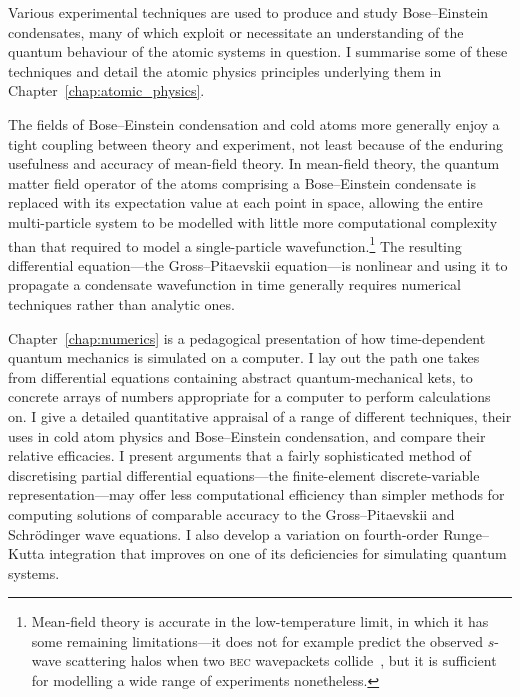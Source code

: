 Various experimental techniques are used to produce and study Bose--Einstein condensates, many of which exploit or necessitate an understanding of the quantum behaviour of the atomic systems in question. I summarise some of these techniques and detail the atomic physics principles underlying them in Chapter~\ref{chap:atomic_physics}.

The fields of Bose--Einstein condensation and cold atoms more generally enjoy a tight coupling between theory and experiment, not least because of the enduring usefulness and accuracy of mean-field theory. In mean-field theory, the quantum matter field operator of the atoms comprising a Bose--Einstein condensate is replaced with its expectation value at each point in space, allowing the entire multi-particle system to be modelled with little more computational complexity than that required to model a single-particle wavefunction.\footnote{Mean-field theory is accurate in the low-temperature limit, in which it has some remaining limitations---it does not for example predict the observed $s$-wave scattering halos when two \textsc{bec} wavepackets collide~\cite{norrie_quantum_2006}, but it is sufficient for modelling a  wide range of experiments nonetheless.} The resulting differential equation---the Gross--Pitaevskii equation---is nonlinear and using it to propagate a condensate wavefunction in time generally requires numerical techniques rather than analytic ones.

Chapter~\ref{chap:numerics} is a pedagogical presentation of how time-dependent quantum mechanics is simulated on a computer. I lay out the path one takes from differential equations containing abstract quantum-mechanical kets, to concrete arrays of numbers appropriate for a computer to perform calculations on. I give a detailed quantitative appraisal of a range of different techniques, their uses in cold atom physics and Bose--Einstein condensation, and compare their relative efficacies. I present arguments that a fairly sophisticated method of discretising partial differential equations---the finite-element discrete-variable representation---may offer less computational efficiency than simpler methods for computing solutions of comparable accuracy to the Gross--Pitaevskii and Schr\"odinger wave equations. I also develop a variation on fourth-order Runge--Kutta integration that improves on one of its deficiencies for simulating quantum systems. 

